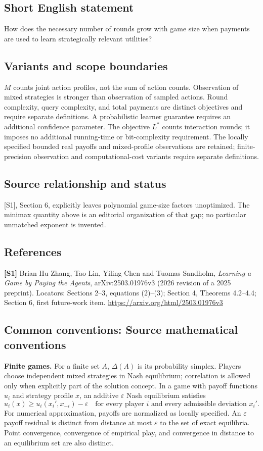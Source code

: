 \documentclass[11pt,a4paper]{article}
\begin{document}
\subsection*{Short English statement}
How does the necessary number of rounds grow with game size when payments are used to learn strategically relevant utilities?
\subsection*{Variants and scope boundaries}
$M$ counts joint action profiles, not the sum of action counts. Observation of mixed strategies is stronger than observation of sampled actions. Round complexity, query complexity, and total payments are distinct objectives and require separate definitions. A probabilistic learner guarantee requires an additional confidence parameter. The objective $L^*$ counts interaction rounds; it imposes no additional running-time or bit-complexity requirement. The locally specified bounded real payoffs and mixed-profile observations are retained; finite-precision observation and computational-cost variants require separate definitions.
\subsection*{Source relationship and status}
[S1], Section 6, explicitly leaves polynomial game-size factors unoptimized. The minimax quantity above is an editorial organization of that gap; no particular unmatched exponent is invented.
\subsection*{References}
\begingroup\footnotesize\raggedright
\textbf{[S1]} Brian Hu Zhang, Tao Lin, Yiling Chen and Tuomas Sandholm, \emph{Learning a Game by Paying the Agents}, arXiv:2503.01976v3 (2026 revision of a 2025 preprint). Locators: Sections 2--3, equations (2)--(3); Section 4, Theorems 4.2--4.4; Section 6, first future-work item. \url{https://arxiv.org/html/2503.01976v3}
\par\endgroup

\subsection*{Common conventions: Source mathematical conventions}

\textbf{Finite games.} For a finite set $A$, $\Delta(A)$ is its probability
simplex. Players choose independent mixed strategies in Nash equilibrium;
correlation is allowed only when explicitly part of the solution concept.
In a game with payoff functions $u_i$ and strategy profile $x$, an additive
$\varepsilon$ Nash equilibrium satisfies
\[
 u_i(x)\geq u_i(x_i',x_{-i})-\varepsilon
 \quad\text{for every player $i$ and every admissible deviation $x_i'$}.
\]
For numerical approximation, payoffs are normalized as locally specified.
An $\varepsilon$ payoff residual is distinct from distance at most
$\varepsilon$ to the set of exact equilibria. Point convergence, convergence
of empirical play, and convergence in distance to an equilibrium set are
also distinct.
\end{document}
